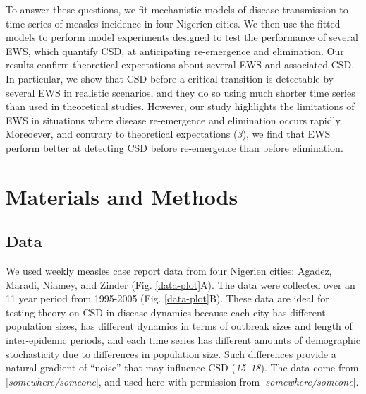 \documentclass[3p]{elsarticle} %
\begin{document}
To answer these questions, we fit mechanistic models of disease
transmission to time series of measles incidence in four Nigerien
cities. We then use the fitted models to perform model experiments
designed to test the performance of several EWS, which quantify CSD, at
anticipating re-emergence and elimination. Our results confirm
theoretical expectations about several EWS and associated CSD. In
particular, we show that CSD before a critical transition is detectable
by several EWS in realistic scenarios, and they do so using much shorter
time series than used in theoretical studies. However, our study
highlights the limitations of EWS in situations where disease
re-emergence and elimination occurs rapidly. Moreoever, and contrary to
theoretical expectations (\emph{3}), we find that EWS perform better at
detecting CSD before re-emergence than before elimination.

\hypertarget{materials-and-methods}{%
\section{Materials and Methods}\label{materials-and-methods}}

\hypertarget{data}{%
\subsection{Data}\label{data}}

We used weekly measles case report data from four Nigerien cities:
Agadez, Maradi, Niamey, and Zinder (Fig. \ref{data-plot}A). The data
were collected over an 11 year period from 1995-2005 (Fig.
\ref{data-plot}B). These data are ideal for testing theory on CSD in
disease dynamics because each city has different population sizes, has
different dynamics in terms of outbreak sizes and length of
inter-epidemic periods, and each time series has different amounts of
demographic stochasticity due to differences in population size. Such
differences provide a natural gradient of ``noise'' that may influence
CSD (\emph{15}--\emph{18}). The data come from
{[}\emph{somewhere/someone}{]}, and used here with permission from
{[}\emph{somewhere/someone}{]}.
\end{document}
